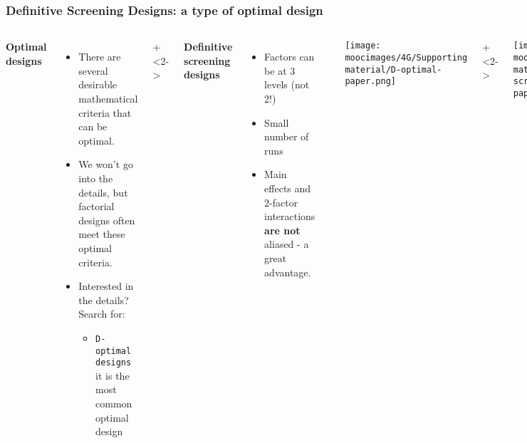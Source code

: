 \documentclass[handout,11pt,aspectratio=169,mathserif]{beamer}
\begin{document}
\begin{frame}\frametitle{Definitive Screening Designs: a type of optimal design}
	\begin{columns}[T]
			\textbf{Optimal designs}
			
			\begin{itemize}
				\item	There are several desirable mathematical criteria that can be optimal.
				\item	We won't go into the details, but factorial designs often meet these optimal criteria.
				
				\item	Interested in the details? Search for:
					\begin{itemize}
						\item	\texttt{D-optimal designs}\\
							it is the most common optimal design
					\end{itemize}
			\end{itemize}
			
			\onslide+<2->{
			\textbf{Definitive screening designs}
				\begin{itemize}
					\item	Factors can be at 3 levels (not 2!)
					\item	Small number of runs
					\item	Main effects and 2-factor interactions \textbf{are not} aliased - a great advantage.
				\end{itemize}
			}
			\rule[3mm]{0.01cm}{90mm}
			
			\centerline{\texttt{[image: \\moocimages/4G/Supporting material/D-optimal-paper.png]}}
		
			\onslide+<2->{
				\vspace{1cm}
				\centerline{\texttt{[image: \\moocimages/4H/Supporting material/definitive-screening-design-paper.png]}}
			}
			
	\end{columns}	
\end{frame}
\end{document}
